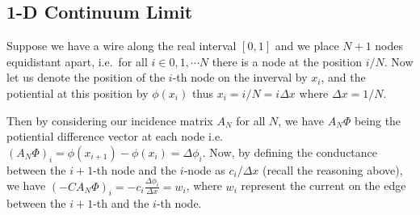 \documentclass[]{article}
\begin{document}
\subsection{1-D Continuum Limit}\label{d-continuum-limit}

Suppose we have a wire along the real interval \([0, 1]\) and we place
\(N + 1\) nodes equidistant apart, i.e.~for all
\(i \in {0, 1, \cdots N}\) there is a node at the position \(i / N\).
Now let us denote the position of the \(i\)-th node on the inverval by
\(x_i\), and the potiential at this position by \(\phi(x_i)\) thus
\(x_i = i / N = i \Delta x\) where \(\Delta x = 1 / N\).

Then by considering our incidence matrix \(A_N\) for all \(N\), we have
\(A_N \Phi\) being the potiential difference vector at each node i.e.
\((A_N \Phi)_i = \phi(x_{i+1}) - \phi(x_i) = \Delta \phi_i\). Now, by
defining the conductance between the \(i+1\)-th node and the \(i\)-node
as \(c_i / \Delta x\) (recall the reasoning above), we have
\((-CA_N \Phi)_i = -c_i \frac{\Delta \phi_i}{\Delta x} = w_i\), where
\(w_i\) represent the current on the edge between the \(i+1\)-th and the
\(i\)-th node.
\end{document}
